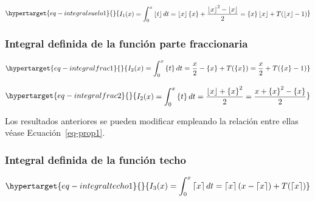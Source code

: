 \documentclass[
  letterpaper,
  DIV=11,
  numbers=noendperiod]{scrreprt}
\begin{document}
\begin{equation}\protect\hypertarget{eq-integralsuelo1}{}{
\begin{align}
I_{1}(x) = \int_0^{x}{\left\lfloor t \right\rfloor dt} =
\left\lfloor x \right\rfloor \left\{ x \right\} + \frac{\left\lfloor x \right\rfloor^2 - \left\lfloor x \right\rfloor}{2} = 
\left\{ x \right\}\left\lfloor x \right\rfloor + T(\left\lfloor x \right\rfloor - 1)
\end{align}
}\label{eq-integralsuelo1}\end{equation}

\hypertarget{integral-definida-de-la-funciuxf3n-parte-fraccionaria}{%
\subsubsection{Integral definida de la función parte
fraccionaria}\label{integral-definida-de-la-funciuxf3n-parte-fraccionaria}}

\begin{equation}\protect\hypertarget{eq-integralfrac1}{}{
\begin{multline}
I_{2}(x) = 
\int_0^x \left\{{t}\right\} dt =
\frac{x}{2} - \left\{ x \right\} + T(\left\{ x \right\}) =
\frac{x}{2} + T(\left\{ x \right\}-1)
\end{multline}
}\label{eq-integralfrac1}\end{equation}

\begin{equation}\protect\hypertarget{eq-integralfrac2}{}{
\begin{multline}
I_{2}(x) = 
\int_0^x \left\{ t \right\} dt =
\frac{\left\lfloor x \right\rfloor + \left\{ x \right\}^{2}}{2} =
\frac{x + \left\{ x \right\}^{2}-\left\{ x \right\}}{2}
\end{multline} 
}\label{eq-integralfrac2}\end{equation}

Los resultados anteriores se pueden modificar empleando la relación
entre ellas véase Ecuación~\ref{eq-prop1}.

\hypertarget{integral-definida-de-la-funciuxf3n-techo}{%
\subsubsection{Integral definida de la función
techo}\label{integral-definida-de-la-funciuxf3n-techo}}

\begin{equation}\protect\hypertarget{eq-integraltecho1}{}{
\begin{multline}
I_{3}(x) = 
\int_{0}^{x}{\left\lceil  x \right\rceil dt} =
\left\lceil  x \right\rceil (x-\left\lceil  x \right\rceil) + T(\left\lceil  x \right\rceil)
\end{multline}
}\label{eq-integraltecho1}\end{equation}
\end{document}

